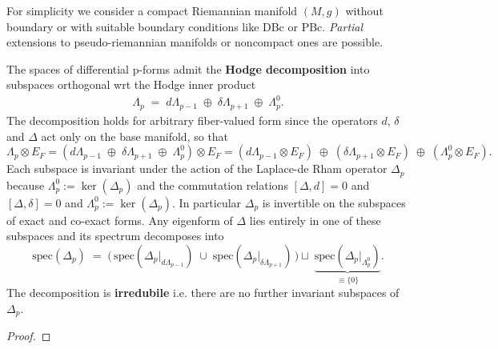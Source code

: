 \documentclass[../geometry_main.tex]{subfiles}
\begin{document}
\begin{mytheorem}
%
For simplicity we consider a compact Riemannian manifold $(M,g)$ without boundary or with suitable boundary conditions like DBc or PBc.
\emph{Partial} extensions to pseudo-riemannian manifolds or noncompact ones are possible.

The spaces of differential p-forms admit the \textbf{Hodge decomposition} into subspaces orthogonal wrt the Hodge inner product
\begin{align}
    \Lambda_p \;=\;d\Lambda_{p-1}\;\oplus\;\delta\Lambda_{p+1}\;\oplus\;\Lambda_p^0.
\end{align}
The decomposition holds for arbitrary fiber-valued form since the operators \(d\), \(\delta\) and \(\Delta\) act only on the base manifold, so that 
 \begin{equation}
    \Lambda_p \otimes E_F = \left(d\Lambda_{p-1}\;\oplus\;\delta\Lambda_{p+1}\;\oplus\;\Lambda_p^0\right)\otimes E_F = \left(d\Lambda_{p-1}\otimes E_F\right)\;\oplus\;\left(\delta\Lambda_{p+1}\otimes E_F\right)\;\oplus\;\left(\Lambda_p^0\otimes E_F\right).
\end{equation}
Each subspace is invariant under the action of the Laplace-de Rham operator \(\Delta_p\) because $\Lambda_p^0:=\ker(\Delta_p)$ and the commutation relations \([\Delta,d]=0\) and \([\Delta,\delta]=0\) and $\Lambda_p^0:=\ker(\Delta_p)$.
In particular $\Delta_p$ is invertible on the subspaces of exact and co-exact forms.
Any eigenform of $\Delta$ lies entirely in one of these subspaces and its spectrum decomposes into
\begin{equation}
    \mathrm{spec}(\Delta_p) \;=\; \Big(\,\mathrm{spec}(\Delta_p|_{d\Lambda_{p-1}}) \;\cup\; \mathrm{spec}(\Delta_p|_{\delta\Lambda_{p+1}})\,\Big) \sqcup\; \underbrace{\mathrm{spec}(\Delta_p|_{\Lambda_p^0})}_{\equiv\{0\}}.
\end{equation}
The decomposition is \textbf{irredubile} i.e. there are no further invariant subspaces of \(\Delta_p\).
\end{mytheorem}
\begin{proof}
\end{proof}
\end{document}
